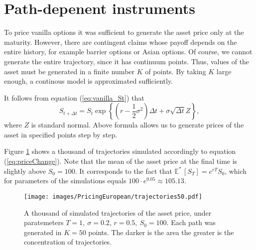 \documentclass[a4paper,11pt, twoside]{book}
\theoremstyle{definition}
\theoremstyle{remark}
\def\Em{{\mathbb{E}^*}\,}
\begin{document}
\section{Path-depenent instruments}
\label{sec:pricing_complicated}

To price vanilla options it was sufficient to generate the asset price only at the maturity. However, there are contingent claims whose payoff depends on the entire history, for example barrier options or Asian options. Of course, we cannot generate the entire trajectory, since it has continuum points. Thus, values of the asset must be generated in a finite number $K$ of points. By taking $K$ large enough, a continous model is approximated sufficiently.

It follows from equation (\ref{eq:vanilla_St}) that
\begin{equation}
 \label{eq:priceChange}
 S_{t + {\Delta} t} = S_t \exp\left\{ (r - \frac{1}{2}\sigma^2)\Delta t + \sigma \sqrt{\Delta t} Z \right\},
\end{equation}
where $Z$ is standard normal. Above formula allows us to generate prices of the asset in specified points step by step.

Figure \ref{fig:trajectories} shows a thousand of trajectories simulated accordingly to equation (\ref{eq:priceChange}). Note that the mean of the asset price at the final time is slightly above $S_0 = 100$. It corresponds to the fact that $\Em [S_T] = e^{rT}S_0$, which for parameters of the simulations equals $100\cdot e^{0.05} \approx 105.13$.

\begin{figure}[ht]
\centering
 \texttt{[image: images/PricingEuropean/trajectories50.pdf]}
\caption{A thousand of simulated trajectories of the asset price, under paratemeters ${T=1},\ {\sigma=0.2}$, ${r=0.5},\ {S_0=100}$. Each path was generated in $K=50$ points. The darker is the area the greater is the concentration of trajectories.}
\label{fig:trajectories}
\end{figure}
\end{document}
